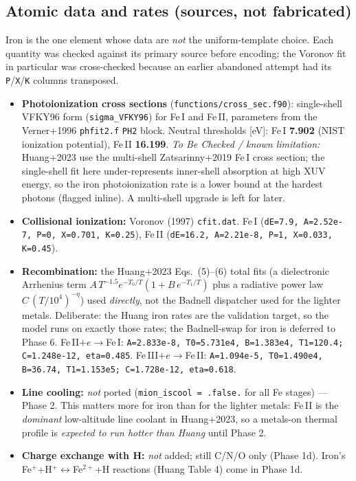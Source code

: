 \documentclass[english,a4paper]{kiseon_memo}
\begin{document}
\subsection{Atomic data and rates (sources, not fabricated)}

Iron is the one element whose data are \emph{not} the uniform-template choice.
Each quantity was checked against its primary source before encoding; the Voronov
fit in particular was cross-checked because an earlier abandoned attempt had its
\verb|P|/\verb|X|/\verb|K| columns transposed.

{\sloppy
\begin{itemize}
\item \textbf{Photoionization cross sections} (\texttt{functions/cross\_sec.f90}):
  single-shell VFKY96 form (\verb|sigma_VFKY96|) for Fe\,I and Fe\,II, parameters
  from the Verner+1996 \texttt{phfit2.f} \texttt{PH2} block. Neutral thresholds
  [eV]: Fe\,I \textbf{7.902} (NIST ionization potential), Fe\,II \textbf{16.199}.
  \emph{To Be Checked / known limitation:} Huang+2023 use the multi-shell
  Zatsarinny+2019 Fe\,I cross section; the single-shell fit here under-represents
  inner-shell absorption at high XUV energy, so the iron photoionization rate is a
  lower bound at the hardest photons (flagged inline). A multi-shell upgrade is
  left for later.
\item \textbf{Collisional ionization:} Voronov (1997) \texttt{cfit.dat}.
  Fe\,I (\verb|dE=7.9, A=2.52e-7, P=0, X=0.701, K=0.25|),
  Fe\,II (\verb|dE=16.2, A=2.21e-8, P=1, X=0.033, K=0.45|).
\item \textbf{Recombination:} the Huang+2023 Eqs.~(5)--(6) total fits
  (a dielectronic Arrhenius term $A\,T^{-1.5}e^{-T_0/T}(1+B\,e^{-T_1/T})$ plus a
  radiative power law $C\,(T/10^4)^{-\eta}$) used \emph{directly}, not the Badnell
  dispatcher used for the lighter metals. Deliberate: the Huang iron rates are the
  validation target, so the model runs on exactly those rates; the Badnell-swap
  for iron is deferred to Phase 6.
  Fe\,II$+e\rightarrow$Fe\,I:
  \verb|A=2.833e-8, T0=5.731e4, B=1.383e4, T1=120.4; C=1.248e-12, eta=0.485|.
  Fe\,III$+e\rightarrow$Fe\,II:
  \verb|A=1.094e-5, T0=1.490e4, B=36.74, T1=1.153e5; C=1.728e-12, eta=0.618|.
\item \textbf{Line cooling:} \emph{not} ported
  (\verb|mion_iscool = .false.| for all Fe stages) --- Phase 2. This matters more
  for iron than for the lighter metals: Fe\,II is the \emph{dominant} low-altitude
  line coolant in Huang+2023, so a metals-on thermal profile is \emph{expected to
  run hotter than Huang} until Phase 2.
\item \textbf{Charge exchange with H:} \emph{not} added; still C/N/O only
  (Phase 1d). Iron's Fe$^+$+H$^+\!\leftrightarrow$Fe$^{2+}$+H reactions
  (Huang Table 4) come in Phase 1d.
\end{itemize}
}
\end{document}

